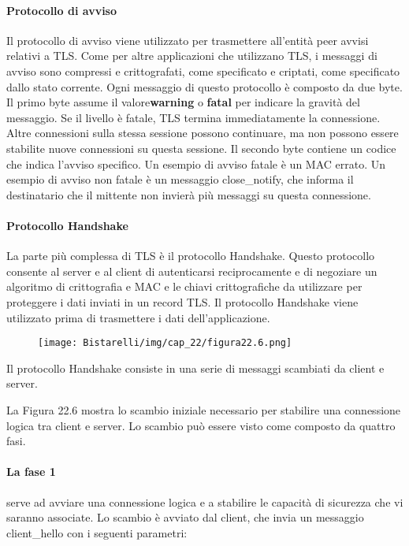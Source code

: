 \singlespacing

\paragraph{Protocollo di avviso} Il protocollo di avviso viene utilizzato per trasmettere all'entità peer avvisi relativi a TLS. Come per altre applicazioni che utilizzano TLS, i messaggi di avviso sono compressi e crittografati, come specificato e criptati, come specificato dallo stato corrente. Ogni messaggio di questo protocollo è composto da due byte. Il primo byte assume il valore\textbf{warning} o \textbf{fatal} per indicare la gravità del messaggio. Se il livello è fatale, TLS termina immediatamente la connessione. Altre connessioni sulla stessa sessione possono continuare, ma non possono essere stabilite nuove connessioni su questa sessione. Il secondo byte contiene un codice che indica l'avviso specifico. Un esempio di avviso fatale è un MAC errato. Un esempio di avviso non fatale è un messaggio close\_notify, che informa il destinatario che il mittente non invierà più messaggi su questa connessione.

\singlespacing

\paragraph{Protocollo Handshake} La parte più complessa di TLS è il protocollo Handshake. Questo protocollo consente al server e al client di autenticarsi reciprocamente e di negoziare un algoritmo di crittografia e MAC e le chiavi crittografiche da utilizzare per proteggere i dati inviati in un record TLS. Il protocollo Handshake viene utilizzato prima di trasmettere i dati dell'applicazione.

\singlespacing

\begin{figure}[H]
	\centering
    \texttt{[image: Bistarelli/img/cap\_22/figura22.6.png]}
\end{figure}

Il protocollo Handshake consiste in una serie di messaggi scambiati da client e server.

\singlespacing

La Figura 22.6 mostra lo scambio iniziale necessario per stabilire una connessione logica tra client e server. Lo scambio può essere visto come composto da quattro fasi. 

\paragraph{La fase 1} serve ad avviare una connessione logica e a stabilire le capacità di sicurezza che vi saranno associate. Lo scambio è avviato dal client, che invia un messaggio client\_hello con i seguenti parametri:

